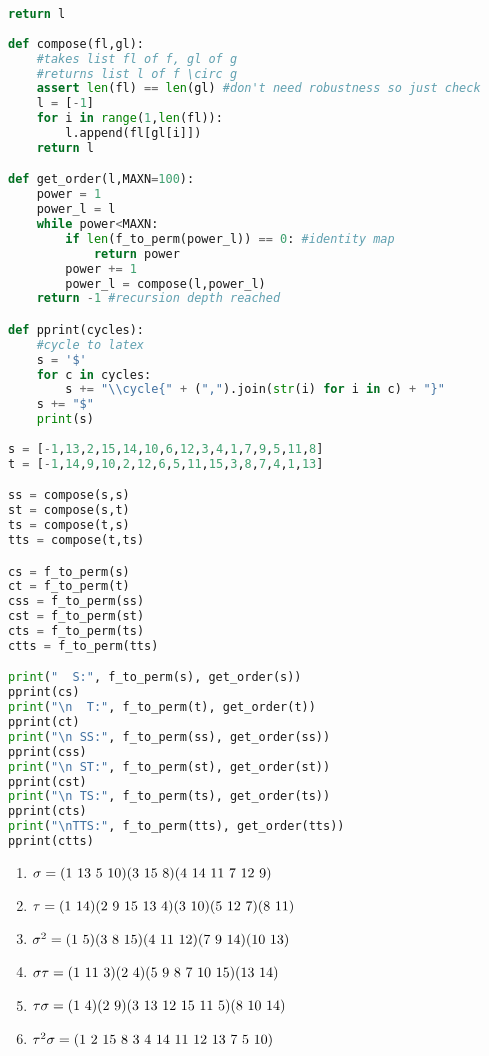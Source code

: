 \documentclass[]{article}
\newcommand*{\cycle}[1]{( \foreach \entry [count=\i] in {#1} {\ifnum\i>1\ \fi\entry})}
\begin{document}
\begin{enumerate}
\begin{lstlisting}[language=Python]
    return l
   
def compose(fl,gl):
    #takes list fl of f, gl of g
    #returns list l of f \circ g
    assert len(fl) == len(gl) #don't need robustness so just check
    l = [-1]
    for i in range(1,len(fl)):
        l.append(fl[gl[i]])
    return l

def get_order(l,MAXN=100):
    power = 1
    power_l = l
    while power<MAXN:
        if len(f_to_perm(power_l)) == 0: #identity map
            return power
        power += 1
        power_l = compose(l,power_l)
    return -1 #recursion depth reached

def pprint(cycles):
    #cycle to latex
    s = '$'
    for c in cycles:
        s += "\\cycle{" + (",").join(str(i) for i in c) + "}"
    s += "$"
    print(s)
    
s = [-1,13,2,15,14,10,6,12,3,4,1,7,9,5,11,8]
t = [-1,14,9,10,2,12,6,5,11,15,3,8,7,4,1,13]

ss = compose(s,s)
st = compose(s,t)
ts = compose(t,s)
tts = compose(t,ts)

cs = f_to_perm(s)
ct = f_to_perm(t)
css = f_to_perm(ss)
cst = f_to_perm(st)
cts = f_to_perm(ts)
ctts = f_to_perm(tts)

print("  S:", f_to_perm(s), get_order(s))
pprint(cs)
print("\n  T:", f_to_perm(t), get_order(t))
pprint(ct)
print("\n SS:", f_to_perm(ss), get_order(ss))
pprint(css)
print("\n ST:", f_to_perm(st), get_order(st))
pprint(cst)
print("\n TS:", f_to_perm(ts), get_order(ts))
pprint(cts)
print("\nTTS:", f_to_perm(tts), get_order(tts))
pprint(ctts)
\end{lstlisting}

\begin{enumerate}
\item $\sigma = \cycle{1,13,5,10}\cycle{3,15,8}\cycle{4,14,11,7,12,9}$
\item $\tau = \cycle{1,14}\cycle{2,9,15,13,4}\cycle{3,10}\cycle{5,12,7}\cycle{8,11}$
\item $\sigma^2 = \cycle{1,5}\cycle{3,8,15}\cycle{4,11,12}\cycle{7,9,14}\cycle{10,13}$
\item $\sigma\tau = \cycle{1,11,3}\cycle{2,4}\cycle{5,9,8,7,10,15}\cycle{13,14}$
\item $\tau\sigma = \cycle{1,4}\cycle{2,9}\cycle{3,13,12,15,11,5}\cycle{8,10,14}$
\item $\tau^2\sigma = \cycle{1,2,15,8,3,4,14,11,12,13,7,5,10}$
\end{enumerate}



\end{enumerate}
\end{document}
